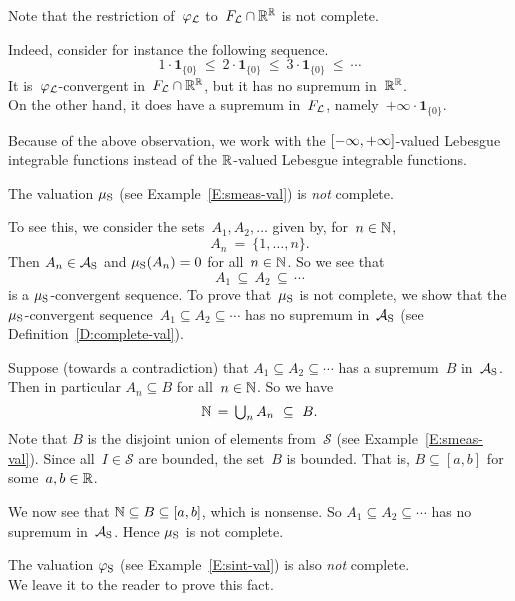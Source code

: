 \documentclass[main.tex]{subfiles}
\begin{document}
%
%
\begin{rem}
\label{R:non-finite-functions}
Note that the restriction of~$\varphi_{\mathcal{L}}$ to~$F_{\mathcal{L}}\cap \mathbb{R}^{\mathbb{R}}$
is not complete.

Indeed,
consider for instance
the following sequence.
\begin{equation*}
1\cdot\mathbf{1}_{\{0\}} 
\ \leq\   2\cdot\mathbf{1}_{\{0\}} 
\ \leq\   3\cdot\mathbf{1}_{\{0\}}
\ \leq\  \dotsb
\end{equation*}
It is~$\varphi_{\mathcal{L}}$-convergent
in~$F_{\mathcal{L}}\cap \mathbb{R}^{\mathbb{R}}$,
but it has no supremum in~$\mathbb{R}^{\mathbb{R}}$.\\
On the other hand,
it does have a supremum in~$F_{\mathcal{L}}$, 
namely~$+\infty\cdot \mathbf{1}_{\{0\}}$.

Because of the above observation,
we work with
the ${[-\infty,+\infty]}$-valued Lebesgue integrable functions
instead of the $\mathbb{R}$-valued Lebesgue integrable functions.
\end{rem}
%
%
\begin{ex}
The valuation $\mu_{\mathrm{S}}$ 
(see Example~\ref{E:smeas-val}) is \emph{not} complete.

To see this,
we consider the sets~$A_1,A_2,\dotsc$ given by, for~$n\in\mathbb{N}$,
\begin{equation*}
A_n \ =\  \{1,\dotsc,n\}.
\end{equation*}
Then $A_n\in \mathcal{A}_{\mathrm{S}}$
and $\mu_{\mathrm{S}}(A_n) = 0$
for all~$n\in \mathbb{N}$.
So we see that
\begin{equation*}
A_1 \,\subseteq\, A_2 \,\subseteq\, \dotsb
\end{equation*}
is a $\mu_{\mathrm{S}}$-convergent sequence.
To prove that~$\mu_{\mathrm{S}}$ is not complete,
we  show that
the $\mu_{\mathrm{S}}$-convergent sequence~$A_1 \subseteq A_2 \subseteq \dotsb$
has no supremum in~$\mathcal{A}_{\mathrm{S}}$
(see Definition~\ref{D:complete-val}).

Suppose (towards a contradiction) that $A_1 \subseteq A_2 \subseteq\dotsb$
has a supremum~$B$ in~$\mathcal{A}_{\mathrm{S}}$.
Then in particular $A_n\subseteq B$ for all~$n\in \mathbb{N}$.
So we have
\begin{equation*}
\N \,=\, \textstyle{\bigcup_n A_n} \ \subseteq\  B.
\end{equation*}
Note that $B$ is the disjoint union of
elements from~$\mathcal{S}$ (see Example~\ref{E:smeas-val}).
Since all~$I\in \mathcal{S}$ are bounded, the set~$B$ is bounded.
That is, $B\subseteq [a,b]$ for some~$a,b\in \mathbb{R}$.

We now see that $\mathbb{N}\subseteq B\subseteq [a,b]$,
which is nonsense.
So $A_1 \subseteq A_2 \subseteq \dotsb$ has no supremum
in~$\mathcal{A}_{\mathrm{S}}$.
Hence $\mu_{\mathrm{S}}$ is not complete.
\end{ex}
%
%
\begin{ex}
The valuation $\varphi_{\mathrm{S}}$ 
(see Example~\ref{E:sint-val}) is also \emph{not} complete.\\
We leave it to the reader to prove this fact.
\end{ex}
\end{document}
